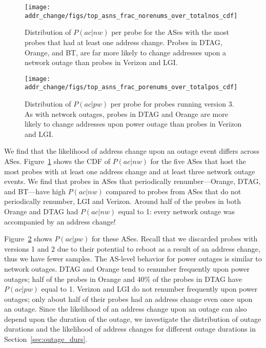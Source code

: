 \begin{figure}[tb]
  \begin{center}
    \texttt{[image: addr\_change/figs/top\_asns\_frac\_norenums\_over\_totalnos\_cdf]}
  \end{center}
  \caption[Distribution of the conditional probability that an address change occurred
given a network outage]{\label{fig:top_asns_frac_norenums_over_totalnos}
Distribution of $P(ac|nw)$ per probe for the ASes with the most probes
that had at least one address change. Probes in DTAG, Orange, and BT, are far more likely to change addresses upon a
    network outage than probes in Verizon and LGI.}
\end{figure}

\begin{figure}[tb]
  \begin{center}
    \texttt{[image: addr\_change/figs/top\_asns\_frac\_porenums\_over\_totalpos\_cdf]}
  \end{center}
  \caption[Distribution of the conditional probability that an address change occurred
given a power outage]{\label{fig:top_asns_frac_porenums_over_totalpos}
%
Distribution of $P(ac|pw)$ per probe for probes running version 3. As
with network outages, probes in DTAG and Orange are more likely
to change addresses upon power outage than probes in Verizon and LGI.}
\end{figure}

We find that the likelihood of address change upon an outage event
differs across
ASes. Figure~\ref{fig:top_asns_frac_norenums_over_totalnos} shows the
CDF of $P(ac|nw)$ for the five ASes that host the most probes with at
least one address change and at least three network outage events. We
find that probes in ASes that periodically renumber---Orange, DTAG,
and BT---have high $P(ac|nw)$ compared to probes from ASes that do not
periodically renumber, LGI and Verizon. Around half of the probes in
both Orange and DTAG had $P(ac|nw)$ equal to 1: every network outage
was accompanied by an address change!

Figure~\ref{fig:top_asns_frac_porenums_over_totalpos} shows $P(ac|pw)$
for these ASes. Recall that we discarded probes with versions 1 and 2
due to their potential to reboot as a result of an address change,
thus we have fewer samples. The AS-level behavior for power outages is
similar to network outages. DTAG and Orange tend to renumber
frequently upon power outages; half of the probes in Orange and 40\%
of the probes in DTAG have $P(ac|pw)$ equal to 1. Verizon and LGI do
not renumber frequently upon power outages; only about half of their
probes had an address change even once upon an outage. Since the
likelihood of an address change upon an outage can also depend upon
the duration of the outage, we investigate the distribution of outage
durations and the likelihood of address changes for different outage
durations in Section~\ref{sec:outage_durs}.

